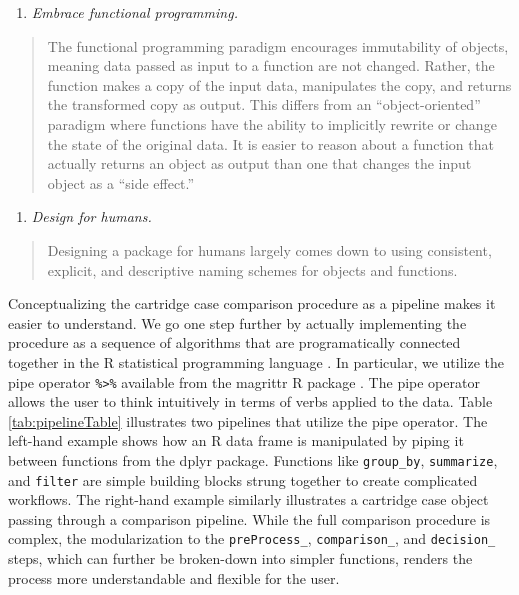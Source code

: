 \documentclass[11pt,]{isuthesis}
\providecommand{\tightlist}{%
  \setlength{\itemsep}{0pt}\setlength{\parskip}{0pt}}
\begin{document}
\begin{enumerate}
\def\labelenumi{\arabic{enumi}.}
\setcounter{enumi}{2}
\tightlist
\item
  \emph{Embrace functional programming.}
\end{enumerate}

\begin{quote}
The functional programming paradigm encourages immutability of objects, meaning data passed as input to a function are not changed.
Rather, the function makes a copy of the input data, manipulates the copy, and returns the transformed copy as output.
This differs from an ``object-oriented'' paradigm where functions have the ability to implicitly rewrite or change the state of the original data.
It is easier to reason about a function that actually returns an object as output than one that changes the input object as a ``side effect.''
\end{quote}

\begin{enumerate}
\def\labelenumi{\arabic{enumi}.}
\setcounter{enumi}{3}
\tightlist
\item
  \emph{Design for humans.}
\end{enumerate}

\begin{quote}
Designing a package for humans largely comes down to using consistent, explicit, and descriptive naming schemes for objects and functions.
\end{quote}

Conceptualizing the cartridge case comparison procedure as a pipeline makes it easier to understand.
We go one step further by actually implementing the procedure as a sequence of algorithms that are programatically connected together in the R statistical programming language \citep{r}.
In particular, we utilize the pipe operator \texttt{\%\textgreater{}\%} available from the magrittr R package \citep{magrittr}.
The pipe operator allows the user to think intuitively in terms of verbs applied to the data.
Table \ref{tab:pipelineTable} illustrates two pipelines that utilize the pipe operator.
The left-hand example shows how an R data frame is manipulated by piping it between functions from the dplyr package.
Functions like \texttt{group\_by}, \texttt{summarize}, and \texttt{filter} are simple building blocks strung together to create complicated workflows.
The right-hand example similarly illustrates a cartridge case object passing through a comparison pipeline.
While the full comparison procedure is complex, the modularization to the \texttt{preProcess\_}, \texttt{comparison\_}, and \texttt{decision\_} steps, which can further be broken-down into simpler functions, renders the process more understandable and flexible for the user.
\end{document}
